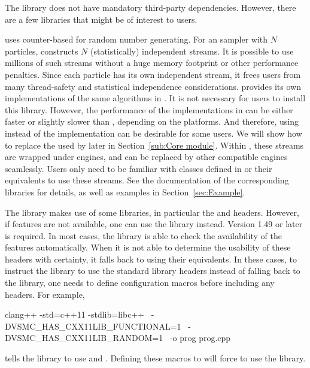 \documentclass[11pt, fontset=Minion, showoverfull,
bib, mintcode, minted=cache]{marticle}
\begin{document}
The library does not have mandatory third-party dependencies. However, there
are a few libraries that might be of interest to users.

\vsmc uses \random \parencite{random} counter-based \rng for random number
generating. For an \smc sampler with $N$ particles, \vsmc constructs $N$
(statistically) independent \rng streams. It is possible to use millions of
such streams without a huge memory footprint or other performance penalties.
Since each particle has its own independent \rng stream, it frees users from
many thread-safety and statistical independence considerations. \vsmc provides
its own implementations of the same algorithms in \random. It is not necessary
for users to install this library. However, the performance of the
implementations in \vsmc can be either faster or slightly slower than \random,
depending on the platforms. And therefore, using \random instead of the \vsmc
implementation can be desirable for some users. We will show how to replace
the \rng used by \vsmc later in Section~\ref{sub:Core module}. Within \vsmc,
these \rng streams are wrapped under \cppoo \rng engines, and can be replaced
by other compatible \rng engines seamlessly. Users only need to be familiar
with classes defined in \cppoo{}  or their \cboost
equivalents to use these \rng streams. See the documentation of the
corresponding libraries for details, as well as examples in
Section~\ref{sec:Example}.

The library makes use of some \cppoo libraries, in particular the
 and  headers. However, if \cppoo
features are not available, one can use the \boost library instead. Version
1.49 or later is required. In most cases, the library is able to check the
availability of the \cppoo features automatically. When it is not able to
determine the usability of these \cppoo headers with certainty, it falls back
to using their \boost equivalents. In these cases, to instruct the library to
use the standard library headers instead of falling back to the \boost
library, one needs to define configuration macros before including any \vsmc
headers. For example,
\begin{shcode}
clang++ -std=c++11 -stdlib=libc++        \
        -DVSMC_HAS_CXX11LIB_FUNCTIONAL=1 \
        -DVSMC_HAS_CXX11LIB_RANDOM=1     \
        -o prog prog.cpp
\end{shcode}
tells the library to use \cppoo{}  and
\cppinline{<random>}.  Defining these macros to  will force \vsmc
to use the \boost library.
\end{document}
